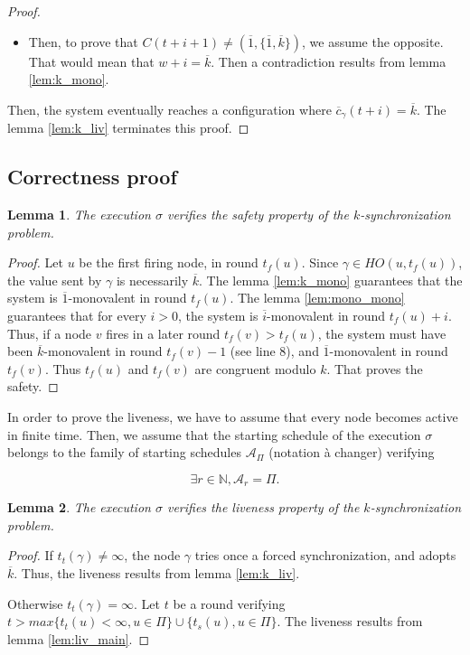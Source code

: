 \documentclass{article}
\newtheorem{lemma}{Lemma}[section]
\newcommand{\cent}{\gamma}
\newcommand{\ts}{t_{s}}
\newcommand{\tf}{t_{f}}
\newcommand{\try}{t_{t}}
\begin{document}
\begin{proof}
\begin{itemize}
		\item Then, to prove that $C(t+i+1) \neq (\overline{1}, \{\overline{1}, \overline{k}\})$, we assume the opposite.
			That would mean that $w+i = \overline{k}$. Then a contradiction results from lemma \ref{lem:k_mono}.
	\end{itemize}
	Then, the system eventually reaches a configuration where $\overline{c}_\gamma(t+i) = \overline{k}$. The lemma \ref{lem:k_liv} terminates this proof.
\end{proof}

\subsection{Correctness proof}

\begin{lemma}\label{lem:saf}
	The execution $\sigma$ verifies the safety property of the $k$-synchronization problem.
\end{lemma}
\begin{proof}
	Let $u$ be the first firing node, in round $\tf(u)$.
	Since $\cent \in HO(u,\tf(u))$, the value sent by $\cent$ is necessarily $\overline{k}$.
	The lemma \ref{lem:k_mono} guarantees that the system is $\overline{1}$-monovalent in round $\tf(u)$.
	The lemma \ref{lem:mono_mono} guarantees that for every $i > 0$, the system is $\overline{i}$-monovalent in round $\tf(u)+i$.
	Thus, if a node $v$ fires in a later round $\tf(v) > \tf(u)$, the system must have been $\overline{k}$-monovalent in round $\tf(v)-1$ (see line 8),
	and $\overline{1}$-monovalent in round $\tf(v)$. Thus $\tf(u)$ and $\tf(v)$ are congruent modulo $k$.
	That proves the safety.
\end{proof}

In order to prove the liveness, we have to assume that every node becomes active in finite time.
Then, we assume that the starting schedule of the execution $\sigma$ belongs to the family of starting schedules $\mathcal{A}_\Pi$ (notation à changer) verifying

$$\exists r \in \mathds{N}, \mathcal{A}_r = \Pi.$$

\begin{lemma}\label{lem:liv}
	The execution $\sigma$ verifies the liveness property of the $k$-synchronization problem.
\end{lemma}
\begin{proof}
	If $\try(\cent) \neq \infty$, the node $\cent$ tries once a forced synchronization, and adopts $\overline{k}$.
	Thus, the liveness results from lemma \ref{lem:k_liv}.

	Otherwise $\try(\cent) = \infty$.
	Let $t$ be a round verifying $t > max \{\try(u) < \infty, u \in \Pi\} \cup \{\ts(u), u \in \Pi\}$.
	The liveness results from lemma \ref{lem:liv_main}.
\end{proof}
\end{document}
